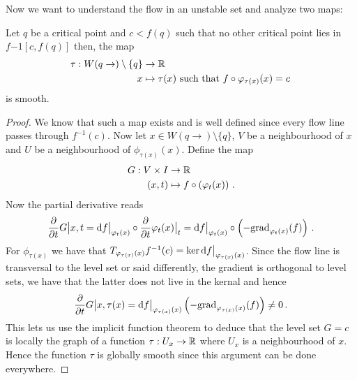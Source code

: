 Now we want to understand the flow in an unstable set and analyze two maps: 
\begin{remark}
Let $q$ be a critical point and $c<f(q)$ such that no other critical point lies in $f{-1}[c,f(q)]$ then, the map
	\begin{align*}
		\tau: W(q\to)\setminus \{q\} &\to \mathbb{R}\\
		x                  &\mapsto \tau(x) \text{ such that }f\circ \varphi_{\tau(x)}(x) =c\,
	\end{align*}
	is smooth.
\end{remark}
\begin{proof}
	We know that such a map exists and is well defined since every flow line passes through $f^{-1}(c)$. Now let $x\in W(q\to)\setminus \{q\}$, $V$ be a neighbourhood of $x$ and  $U$ be a neighbourhood of $\phi_{\tau(x)}(x)$. Define the map
	\begin{align*}
		G:V\times I &\to \mathbb{R}\\
		(x,t)&       \mapsto f\circ \left(\varphi_t(x)\right) \, .
	\end{align*}
	Now the partial derivative reads
	\begin{equation*}
		\frac{\partial}{\partial t}G\big|{x,t}=\mathop{}\!\mathrm{d} f\big|_{\varphi_t(x)}\circ \frac{\partial}{\partial t} \varphi_t(x)\big|_t
		=  \mathop{}\!\mathrm{d} f\big|_{\varphi_t(x)}\circ \left(-\mathrm{grad}_{\varphi_t(x)}(f)\right) \,.
	\end{equation*} For $\phi_{\tau(x)}$ we have that $T_{\varphi_{\tau(x)}(x)}f^{-1}(c)=  \ker\mathop{}\!\mathrm{d} f \big|_{\varphi_{\tau(x)}(x)}$. Since the flow line is transversal to the level set or said differently, the gradient is orthogonal to level sets, we have that the latter does not live in the kernal and hence
	\begin{equation*}
		\frac{\partial}{\partial t}G\big|{x,\tau(x)}=\mathop{}\!\mathrm{d} f \big|_{\varphi_{\tau(x)}(x)}\left(-\mathrm{grad}_{\varphi_{\tau(x)}(x)}(f)\right)\neq 0 \, .
	\end{equation*} This lets us use the implicit function theorem to deduce that the level set $G=c$ is locally the graph of a function $\tau: U_x\to \mathbb{R}$ where $U_x$ is a neighbourhood of $x$. Hence the function $\tau$ is globally smooth since this argument can be done everywhere.
\end{proof}
